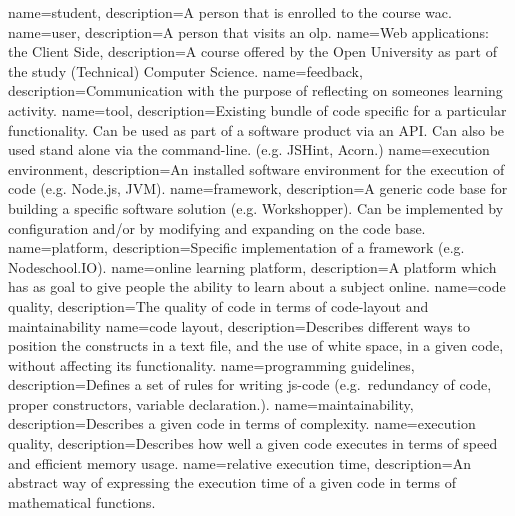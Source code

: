 {
  name=student,
  description={A person that is enrolled to the course \gls{wac}.}
}
{
  name=user,
  description={A person that visits an \gls{olp}.}
}
{
  name=Web applications: the Client Side,
  description={A course offered by the Open University
    as part of the study (Technical) Computer Science.}
}
{
  name=feedback,
  description={Communication with the purpose of
    reflecting on someones learning activity.}
}
{
  name=tool,
  description={Existing bundle of \gls{code}
    specific for a particular functionality.
    Can be used as part of a software product via an API.
    Can also be used stand alone via the command-line.
    (e.g. JSHint, Acorn.)}
}
{
  name=execution environment,
  description={An installed software environment
    for the execution of code (e.g. Node.js, JVM).}
}
{
  name=framework,
  description={A generic code base for building
    a specific software solution (e.g. Workshopper).
    Can be implemented by configuration and/or
    by modifying and expanding on the code base.}
}
{
  name=platform,
  description={Specific implementation of a \gls{framework}
    (e.g. Nodeschool.IO).}
}
{
  name=online learning platform,
  description={A \gls{platform} which has as goal
    to give people the ability to learn about a subject online.}
}
{
  name=code quality,
  description={The quality of code in terms of \gls{code-layout}
    and \gls{maintainability}}
}
{
  name=code layout,
  description={Describes different ways
    to position the \gls{constructs} in a text file,
    and the use of white space, in a given \gls{code},
    without affecting its functionality.}
}
{
  name=programming guidelines,
  description={Defines a set of rules for writing {js-code}
    (e.g.\ redundancy of code, proper constructors, variable declaration.).}
}
{
  name=maintainability,
  description={Describes a given \gls{code} in terms of complexity.}
}
{
  name=execution quality,
  description={Describes how well a given \gls{code} executes
    in terms of speed and efficient memory usage.}
}
{
  name=relative execution time,
  description={An abstract way of expressing the execution time
    of a given \gls{code} in terms of mathematical functions.}
}

